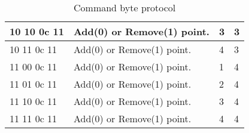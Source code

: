\begin{table}[h]
\begin{tabular}{ | p{3cm} | p{6cm}|p{1cm} | p{1cm}|}
	10 10 0c 11 			&	Add(0) or Remove(1) point. 			& 3 							& 3								\\ \hline
	10 11 0c 11 			&	Add(0) or Remove(1) point. 			& 4 							& 3								\\ \hline
	11 00 0c 11 			&	Add(0) or Remove(1) point. 			& 1 							& 4								\\ \hline
	11 01 0c 11 			&	Add(0) or Remove(1) point. 			& 2 							& 4								\\ \hline
	11 10 0c 11 			&	Add(0) or Remove(1) point. 			& 3 							& 4								\\ \hline
	11 11 0c 11 			&	Add(0) or Remove(1) point. 			& 4 							& 4								\\ \hline
    \end{tabular}
    \caption{Command byte protocol}
    \label{tab:cmdByte}
\end{table}





